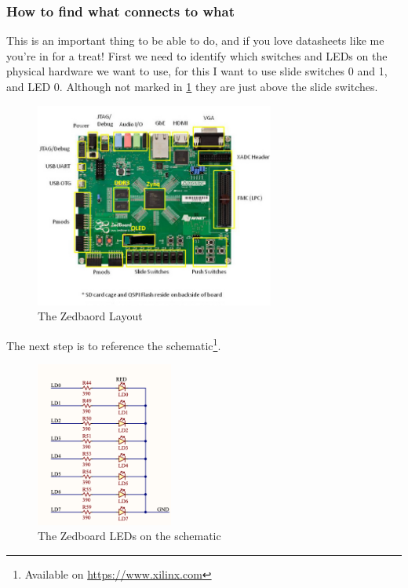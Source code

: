 \subsubsection{How to find what connects to what}
This is an important thing to be able to do, and if you love datasheets like me you're in for a treat! First we need to identify which switches and LEDs on the physical hardware we want to use, for this I want to use slide switches 0 and 1, and LED 0. Although not marked in \cref{fig:zedoverlay} they are just above the slide switches.


\begin{figure}[H]
    \begin{center}
        \includegraphics[width=0.7\textwidth]{./src/Zedboard_Overlay.jpg}
        \caption{The Zedbaord Layout}
        \label{fig:zedoverlay}
    \end{center}
\end{figure}

The next step is to reference the schematic\footnote{Available on \url{https://www.xilinx.com}}.


\begin{figure}[H]
    \begin{center}
        \includegraphics[width=0.4\textwidth]{./src/schem_led.png}
        \caption{The Zedboard LEDs  on the schematic}
        \label{fig:schemled}
    \end{center}
\end{figure}

